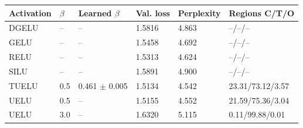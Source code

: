 \begin{tabular}{llllll}
\toprule
Activation & $\beta$ & Learned $\beta$ & Val. loss & Perplexity & Regions C/T/O \\
\midrule
DGELU & -- & -- & 1.5816 & 4.863 & --/--/-- \\
GELU & -- & -- & 1.5458 & 4.692 & --/--/-- \\
RELU & -- & -- & 1.5313 & 4.624 & --/--/-- \\
SILU & -- & -- & 1.5891 & 4.900 & --/--/-- \\
TUELU & 0.5 & 0.461 $\pm$ 0.005 & 1.5134 & 4.542 & 23.31/73.12/3.57 \\
UELU & 0.5 & -- & 1.5155 & 4.552 & 21.59/75.36/3.04 \\
UELU & 3.0 & -- & 1.6320 & 5.115 & 0.11/99.88/0.01 \\
\bottomrule
\end{tabular}
